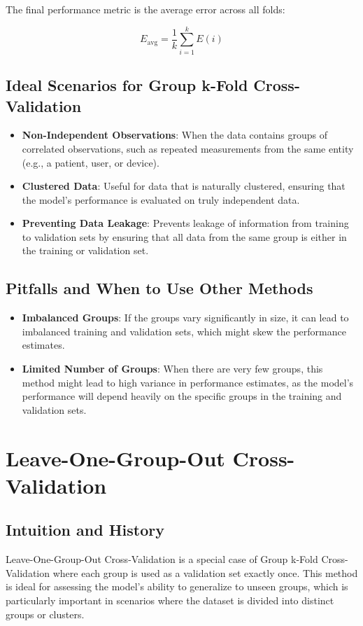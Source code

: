 \documentclass[10pt]{article}
\begin{document}
The final performance metric is the average error across all folds:

\[
E_{\text{avg}} = \frac{1}{k} \sum_{i=1}^{k} E(i)
\]

\subsection{Ideal Scenarios for Group k-Fold Cross-Validation}
\begin{itemize}
    \item \textbf{Non-Independent Observations}: When the data contains groups of correlated observations, such as repeated measurements from the same entity (e.g., a patient, user, or device).
    \item \textbf{Clustered Data}: Useful for data that is naturally clustered, ensuring that the model's performance is evaluated on truly independent data.
    \item \textbf{Preventing Data Leakage}: Prevents leakage of information from training to validation sets by ensuring that all data from the same group is either in the training or validation set.
\end{itemize}

\subsection{Pitfalls and When to Use Other Methods}
\begin{itemize}
    \item \textbf{Imbalanced Groups}: If the groups vary significantly in size, it can lead to imbalanced training and validation sets, which might skew the performance estimates.
    \item \textbf{Limited Number of Groups}: When there are very few groups, this method might lead to high variance in performance estimates, as the model’s performance will depend heavily on the specific groups in the training and validation sets.
\end{itemize}

\section{Leave-One-Group-Out Cross-Validation}
\subsection{Intuition and History}
Leave-One-Group-Out Cross-Validation is a special case of Group k-Fold Cross-Validation where each group is used as a validation set exactly once. This method is ideal for assessing the model's ability to generalize to unseen groups, which is particularly important in scenarios where the dataset is divided into distinct groups or clusters.
\end{document}

